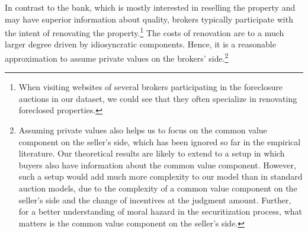 \documentclass[11pt,twopage]{article}
\begin{document}
In contrast to the bank, which is mostly interested in reselling the
property and may have superior information about quality, brokers
typically participate with the intent of renovating the
property.\footnote{When visiting websites of several brokers
  participating in the foreclosure auctions in our dataset, we could
  see that they often specialize in renovating foreclosed properties.}
The costs of renovation are to a much larger degree driven by
idiosyncratic components. Hence, it is a reasonable approximation to
assume private values on the brokers' side.\footnote{Assuming private
  values also helps us to focus on the common value component on the
  seller's side, which has been ignored so far in the empirical
  literature. Our theoretical results are likely to extend to a setup
  in which buyers also have information about the common value
  component. However, such a setup would add much more complexity to
  our model than in standard auction models, due to the complexity of
  a common value component on the seller's side and the change of
  incentives at the judgment amount. Further, for a better
  understanding of moral hazard in the securitization process, what
  matters is the common value component on the seller's side.}

\end{document}

